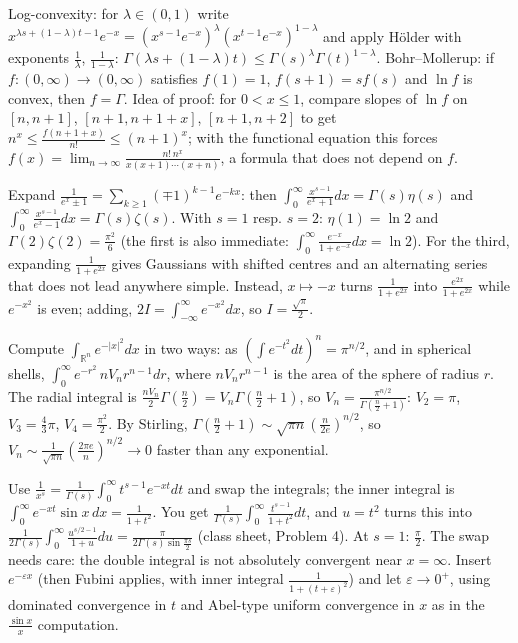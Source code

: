 \documentclass[11pt,a4paper]{article}
\begin{document}
Log-convexity: for \(\lambda\in(0,1)\) write \(x^{\lambda s+(1-\lambda)t-1}e^{-x}=\left(x^{s-1}e^{-x}\right)^\lambda\left(x^{t-1}e^{-x}\right)^{1-\lambda}\) and apply Hölder with exponents \(\frac1\lambda\), \(\frac1{1-\lambda}\): \(\Gamma(\lambda s+(1-\lambda)t)\le\Gamma(s)^\lambda\Gamma(t)^{1-\lambda}\).
Bohr--Mollerup: if \(f\colon(0,\infty)\to(0,\infty)\) satisfies \(f(1)=1\), \(f(s+1)=sf(s)\) and \(\ln f\) is convex, then \(f=\Gamma\). Idea of proof: for \(0\lt x\le1\), compare slopes of \(\ln f\) on \([n,n+1]\), \([n+1,n+1+x]\), \([n+1,n+2]\) to get \(n^x\le\frac{f(n+1+x)}{n!}\le(n+1)^x\); with the functional equation this forces \(f(x)=\lim_{n\to\infty}\frac{n!\,n^x}{x(x+1)\cdots(x+n)}\), a formula that does not depend on \(f\).

Expand \(\frac1{e^x\pm1}=\sum_{k\ge1}(\mp1)^{k-1}e^{-kx}\): then \(\int_0^\infty\frac{x^{s-1}}{e^x+1}dx=\Gamma(s)\eta(s)\) and \(\int_0^\infty\frac{x^{s-1}}{e^x-1}dx=\Gamma(s)\zeta(s)\). With \(s=1\) resp. \(s=2\): \(\eta(1)=\ln2\) and \(\Gamma(2)\zeta(2)=\frac{\pi^2}6\) (the first is also immediate: \(\int_0^\infty\frac{e^{-x}}{1+e^{-x}}dx=\ln2\)).
For the third, expanding \(\frac1{1+e^{2x}}\) gives Gaussians with shifted centres and an alternating series that does not lead anywhere simple. Instead, \(x\mapsto-x\) turns \(\frac1{1+e^{2x}}\) into \(\frac{e^{2x}}{1+e^{2x}}\) while \(e^{-x^2}\) is even; adding, \(2I=\int_{-\infty}^\infty e^{-x^2}dx\), so \(I=\frac{\sqrt\pi}2\).

Compute \(\int_{\mathbb R^n}e^{-\lvert x\rvert^2}dx\) in two ways: as \(\left(\int e^{-t^2}dt\right)^n=\pi^{n/2}\), and in spherical shells, \(\int_0^\infty e^{-r^2}\,nV_nr^{n-1}dr\), where \(nV_nr^{n-1}\) is the area of the sphere of radius \(r\).
The radial integral is \(\frac{nV_n}2\Gamma(\frac n2)=V_n\Gamma(\frac n2+1)\), so \(V_n=\frac{\pi^{n/2}}{\Gamma(\frac n2+1)}\): \(V_2=\pi\), \(V_3=\frac43\pi\), \(V_4=\frac{\pi^2}2\).
By Stirling, \(\Gamma(\frac n2+1)\sim\sqrt{\pi n}\left(\frac n{2e}\right)^{n/2}\), so \(V_n\sim\frac1{\sqrt{\pi n}}\left(\frac{2\pi e}n\right)^{n/2}\to0\) faster than any exponential.

Use \(\frac1{x^s}=\frac1{\Gamma(s)}\int_0^\infty t^{s-1}e^{-xt}dt\) and swap the integrals; the inner integral is \(\int_0^\infty e^{-xt}\sin x\,dx=\frac1{1+t^2}\).
You get \(\frac1{\Gamma(s)}\int_0^\infty\frac{t^{s-1}}{1+t^2}dt\), and \(u=t^2\) turns this into \(\frac1{2\Gamma(s)}\int_0^\infty\frac{u^{s/2-1}}{1+u}du=\frac{\pi}{2\Gamma(s)\sin\frac{\pi s}2}\) (class sheet, Problem 4). At \(s=1\): \(\frac\pi2\).
The swap needs care: the double integral is not absolutely convergent near \(x=\infty\). Insert \(e^{-\varepsilon x}\) (then Fubini applies, with inner integral \(\frac{1}{1+(t+\varepsilon)^2}\)) and let \(\varepsilon\to0^+\), using dominated convergence in \(t\) and Abel-type uniform convergence in \(x\) as in the \(\frac{\sin x}x\) computation.
\end{document}
